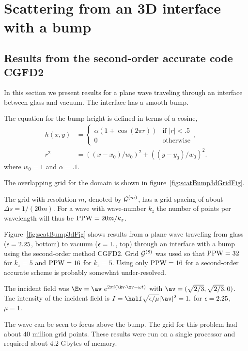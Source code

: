 \section{Scattering from an 3D interface with a bump}\label{sec:scatBump3d}

\newcommand{\ppw}{{\rm PPW}}
\subsection{Results from the second-order accurate code CGFD2}




In this section we present results for a plane wave traveling through an interface between glass and
vacuum. The interface has a smooth bump.

The equation for the bump height is defined in terms of a cosine, 
\begin{align*}
  h(x,y) &= \begin{cases}
               \alpha ( 1 + \cos(2\pi r) ) & \text{if $\vert r\vert <.5$} \\
                 0 & \text{otherwise}
             \end{cases}, \\
  r^2 &= ((x-x_0)/w_0)^2 + ((y-y_0)/w_0)^2. 
\end{align*}
where $w_0=1$ and $\alpha=.1$. 

The overlapping grid for the domain is shown in figure~\ref{fig:scatBump3dGridFig}.

The grid with resolution $m$, denoted by ${\mathcal G}^{(m)}$, has a grid spacing of about $\Delta s = 1/(20 m)$. 
For a wave with wave-number $k_z$ the number of points per wavelength will thus be $\ppw=20 m/k_z$.


Figure~\ref{fig:scatBump3dFig} shows results from a plane wave traveling from glass ($\epsilon=2.25$, bottom)
to vacuum ($\epsilon=1.$, top) through an interface with a bump using the second-order method CGFD2. 
Grid ${\mathcal G}^{(8)}$ was used so that $\ppw=32$ for $k_z=5$ and $\ppw=16$ for $k_z=5$. 
Using only $\ppw=16$ for a second-order accurate scheme is probably somewhat under-resolved.

The incident field was $\Ev=\av~e^{2\pi i(\kv\cdot\xv-\omega t)}$ with $\av=(\sqrt{2/3},\sqrt{2/3},0)$.
Tne intensity of the incident field is $I=\half \sqrt{\eps/\mu} \vert \av \vert ^2 = 1.$ for $\epsilon=2.25$, $\mu=1$. 


The wave can be seen to focus
above the bump. 
The grid for this problem had about $40$ million grid points. These results were run on
a single processor and required about $4.2$ Gbytes of memory.



